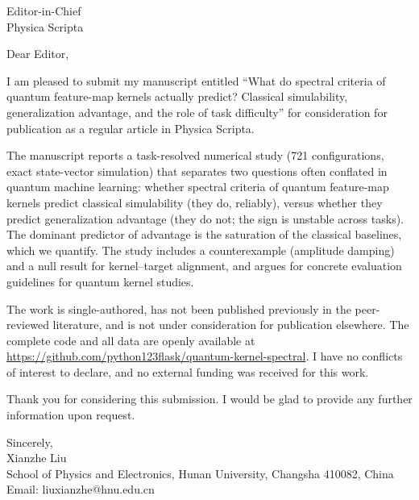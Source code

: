 \documentclass[11pt,a4paper]{article}
\begin{document}
\thispagestyle{empty}

Editor-in-Chief\\
Physica Scripta

\vspace{1em}

Dear Editor,

\vspace{0.5em}

I am pleased to submit my manuscript entitled ``What do spectral criteria of
quantum feature-map kernels actually predict? Classical simulability,
generalization advantage, and the role of task difficulty'' for consideration
for publication as a regular article in Physica Scripta.

\vspace{0.5em}

The manuscript reports a task-resolved numerical study (721 configurations,
exact state-vector simulation) that separates two questions often conflated in
quantum machine learning: whether spectral criteria of quantum feature-map
kernels predict classical simulability (they do, reliably), versus whether they
predict generalization advantage (they do not; the sign is unstable across
tasks). The dominant predictor of advantage is the saturation of the classical
baselines, which we quantify. The study includes a counterexample (amplitude
damping) and a null result for kernel--target alignment, and argues for concrete
evaluation guidelines for quantum kernel studies.

\vspace{0.5em}

The work is single-authored, has not been published previously in the
peer-reviewed literature, and is not under consideration for publication
elsewhere. The complete code and all data are openly available at
\url{https://github.com/python123flask/quantum-kernel-spectral}. I have no
conflicts of interest to declare, and no external funding was received for this
work.

\vspace{0.5em}

Thank you for considering this submission. I would be glad to provide any
further information upon request.

\vspace{1em}

Sincerely,\\[0.3em]

Xianzhe Liu\\
School of Physics and Electronics, Hunan University, Changsha 410082, China\\
Email: liuxianzhe@hnu.edu.cn
\end{document}
